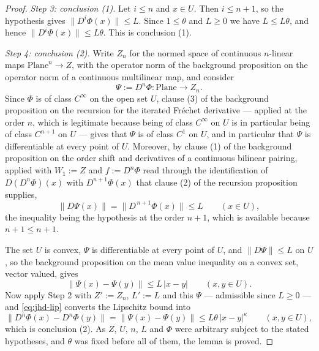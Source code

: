 \begin{proof}
\medskip\noindent\emph{Step 3: conclusion (1).}
Let $i\le n$ and $x\in U$.  Then $i\le n+1$, so the hypothesis gives
$\lVert D^{i}\Phi(x)\rVert\le L$.  Since $1\le\theta$ and $L\ge0$ we have $L\le L\theta$, and
hence $\lVert D^{i}\Phi(x)\rVert\le L\theta$.  This is conclusion (1).

\medskip\noindent\emph{Step 4: conclusion (2).}
Write $Z_n$ for the normed space of continuous $n$-linear maps $\mathrm{Plane}^{n}\to Z$, with
the operator norm of the background proposition on the operator norm of a continuous multilinear
map, and consider
\[
  \Psi:=D^{n}\Phi\colon\mathrm{Plane}\to Z_n .
\]
Since $\Phi$ is of class $C^{\infty}$ on the open set $U$, clause (3) of the background
proposition on the recursion for the iterated Fr\'echet derivative --- applied at the order $n$,
which is legitimate because being of class $C^{\infty}$ on $U$ is in particular being of class
$C^{n+1}$ on $U$ --- gives that $\Psi$ is of class $C^{1}$ on $U$, and in particular that $\Psi$
is differentiable at every point of $U$.  Moreover, by clause (1) of the background proposition
on the order shift and derivatives of a continuous bilinear pairing, applied with $W_1:=Z$ and
$f:=D^{n}\Phi$ read through the identification of $D(D^{n}\Phi)(x)$ with $D^{n+1}\Phi(x)$ that
clause (2) of the recursion proposition supplies,
\[
  \bigl\lVert D\Psi(x)\bigr\rVert=\bigl\lVert D^{\,n+1}\Phi(x)\bigr\rVert\le L
  \qquad(x\in U),
\]
the inequality being the hypothesis at the order $n+1$, which is available because $n+1\le n+1$.

The set $U$ is convex, $\Psi$ is differentiable at every point of $U$, and
$\lVert D\Psi\rVert\le L$ on $U$, so the background proposition on the mean value inequality on a
convex set, vector valued, gives
\[
  \bigl\lVert\Psi(x)-\Psi(y)\bigr\rVert\le L\,\lvert x-y\rvert
  \qquad(x,y\in U).
\]
Now apply Step 2 with $Z':=Z_n$, $L':=L$ and this $\Psi$ --- admissible since $L\ge0$ --- and
\eqref{eq:jhd-lip} converts the Lipschitz bound into
\[
  \bigl\lVert D^{n}\Phi(x)-D^{n}\Phi(y)\bigr\rVert
  =\bigl\lVert\Psi(x)-\Psi(y)\bigr\rVert
  \le L\theta\,\lvert x-y\rvert^{\kappa}
  \qquad(x,y\in U),
\]
which is conclusion (2).  As $Z$, $U$, $n$, $L$ and $\Phi$ were arbitrary subject to the stated
hypotheses, and $\theta$ was fixed before all of them, the lemma is proved.
\end{proof}
